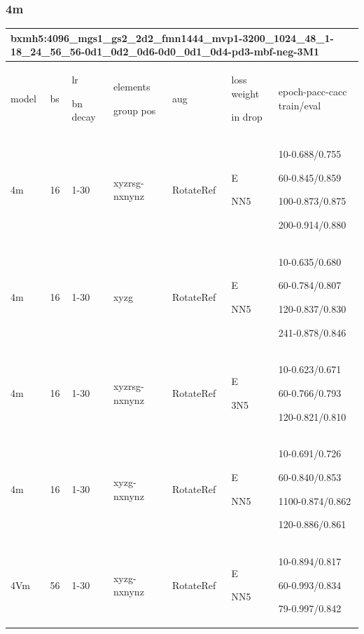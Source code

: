 \documentclass[,table,dvipsnames]{article}
\begin{document}
\subsubsection{4m}
\begin{tabular}{|p{1.5cm}|p{1.5cm}|p{1cm}|p{1.5cm}|p{1.5cm}|p{1.5cm}|p{5cm}| }
	\hline
	\multicolumn{7}{|p{14cm}|}{bxmh5:4096\_mgs1\_gs2\_2d2\_fmn1444\_mvp1-3200\_1024\_48\_1-18\_24\_56\_56-0d1\_0d2\_0d6-0d0\_0d1\_0d4-pd3-mbf-neg-3M1\par 
	}\\
	\hline
	model & bs& lr\par bn decay & elements\par group pos & aug & loss weight\par in drop & epoch-pacc-cacc train/eval \\
	\hline
	
	4m & 16 & 1-30 & xyzrsg-nxnynz & RotateRef & E\par NN5 & 10-0.688/0.755\par 60-0.845/0.859\par 100-0.873/0.875\par 200-0.914/0.880\\
	\hline 
	4m & 16 & 1-30 & xyzg & RotateRef & E\par NN5 & 10-0.635/0.680\par 60-0.784/0.807\par 120-0.837/0.830\par 241-0.878/0.846\\
	\hline 
	4m & 16 & 1-30 & xyzrsg-nxnynz & RotateRef & E\par 3N5 & 10-0.623/0.671\par 60-0.766/0.793\par 120-0.821/0.810\\
	\hline 
	4m & 16 & 1-30 & xyzg-nxnynz & RotateRef & E\par NN5 & 10-0.691/0.726\par 60-0.840/0.853\par 1100-0.874/0.862\par 120-0.886/0.861\\
	\hline 
	4Vm & 56 & 1-30 & xyzg-nxnynz & RotateRef & E\par NN5 & 10-0.894/0.817\par 60-0.993/0.834\par 79-0.997/0.842\\
	\hline
\end{tabular}
\par
\noindent
\end{document}
